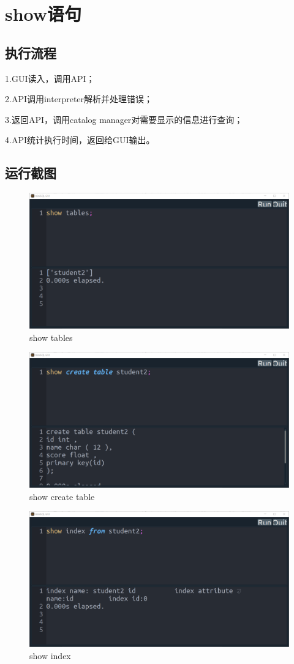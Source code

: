 \documentclass[UTF8]{ctexrep} %
\begin{document}
\section{show语句}
\subsection{执行流程}
1.GUI读入，调用API；
\par
2.API调用interpreter解析并处理错误；
\par
3.返回API，调用catalog manager对需要显示的信息进行查询；
\par
4.API统计执行时间，返回给GUI输出。
\subsection{运行截图}
\begin{figure}[H]
    \centering
    \includegraphics[width=0.8\linewidth]{figure/9.1.png}
    \caption{show tables}
    \label{fig:runtime9.1}
\end{figure}
\begin{figure}[H]
    \centering
    \includegraphics[width=0.8\linewidth]{figure/9.2.png}
    \caption{show create table}
    \label{fig:runtime9.2}
\end{figure}
\begin{figure}[H]
    \centering
    \includegraphics[width=0.8\linewidth]{figure/9.3.png}
    \caption{show index}
    \label{fig:runtime9.3}
\end{figure}
\end{document}
